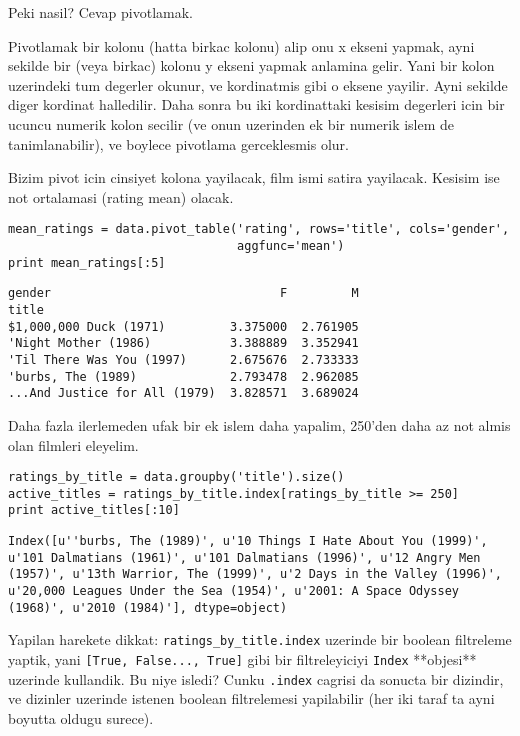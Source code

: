 \documentclass[12pt,fleqn]{article}\usepackage{../common}
\begin{document}
Peki nasil? Cevap pivotlamak.

Pivotlamak bir kolonu (hatta birkac kolonu) alip onu x ekseni yapmak,
ayni sekilde bir (veya birkac) kolonu y ekseni yapmak anlamina
gelir. Yani bir kolon uzerindeki tum degerler okunur, ve kordinatmis
gibi o eksene yayilir. Ayni sekilde diger kordinat halledilir. Daha
sonra bu iki kordinattaki kesisim degerleri icin bir ucuncu numerik
kolon secilir (ve onun uzerinden ek bir numerik islem de
tanimlanabilir), ve boylece pivotlama gerceklesmis olur.

Bizim pivot icin cinsiyet kolona yayilacak, film ismi satira
yayilacak. Kesisim ise not ortalamasi (rating mean) olacak.

\begin{verbatim}
mean_ratings = data.pivot_table('rating', rows='title', cols='gender',
                                aggfunc='mean')
print mean_ratings[:5]
\end{verbatim}

\begin{verbatim}
gender                                F         M
title                                            
$1,000,000 Duck (1971)         3.375000  2.761905
'Night Mother (1986)           3.388889  3.352941
'Til There Was You (1997)      2.675676  2.733333
'burbs, The (1989)             2.793478  2.962085
...And Justice for All (1979)  3.828571  3.689024
\end{verbatim}

Daha fazla ilerlemeden ufak bir ek islem daha yapalim, 250'den daha az
not almis olan filmleri eleyelim.

\begin{verbatim}
ratings_by_title = data.groupby('title').size()
active_titles = ratings_by_title.index[ratings_by_title >= 250]
print active_titles[:10]
\end{verbatim}

\begin{verbatim}
Index([u''burbs, The (1989)', u'10 Things I Hate About You (1999)', u'101 Dalmatians (1961)', u'101 Dalmatians (1996)', u'12 Angry Men (1957)', u'13th Warrior, The (1999)', u'2 Days in the Valley (1996)', u'20,000 Leagues Under the Sea (1954)', u'2001: A Space Odyssey (1968)', u'2010 (1984)'], dtype=object)
\end{verbatim}

Yapilan harekete dikkat: \verb!ratings_by_title.index! uzerinde bir boolean filtreleme yaptik, yani \verb![True, False..., True]!
gibi bir filtreleyiciyi \verb!Index! **objesi** uzerinde kullandik. Bu niye isledi? Cunku \verb!.index! cagrisi da sonucta
bir dizindir, ve dizinler uzerinde istenen boolean filtrelemesi yapilabilir (her iki taraf ta ayni boyutta oldugu surece).
\end{document}
